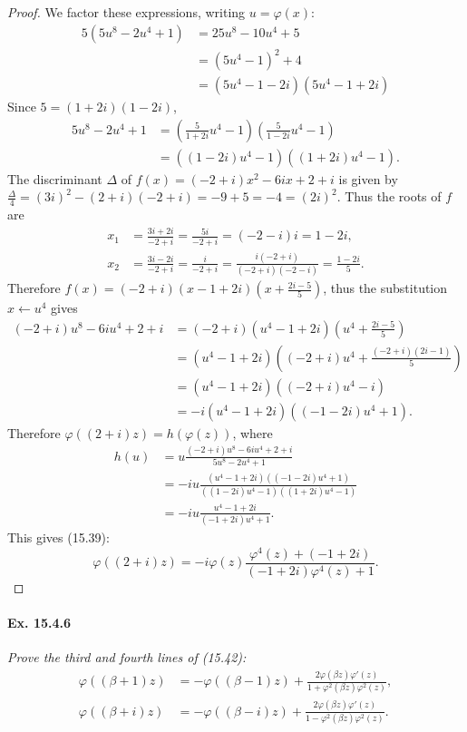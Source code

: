 \documentclass[11pt,a4paper]{article}
\begin{document}
\begin{proof}
We factor these expressions, writing $u = \varphi(x)$:
\begin{align*}
5(5u^8 -2 u^4 + 1) &= 25u^8 - 10 u^4 + 5\\
&=(5u^4 -1)^2 + 4\\
&=(5u^4 - 1-2i)(5u^4 - 1 + 2i)
\end{align*}
Since $5 = (1+2i)(1-2i)$,
\begin{align*}
 5u^8 - 2 u^4 + 1 &= \left(\frac{5}{1+2i} u^4 - 1\right)\left(\frac{5}{1-2i} u^4 - 1 \right)\\
&=((1-2i) u^4 - 1)((1+2i) u^4 - 1).
\end{align*}
The discriminant $\Delta$ of $f(x) = (-2+i)x^2 - 6ix + 2+i$ is given by $\frac{\Delta}{4} = (3i)^2 -(2+i)(-2+i) = -9+ 5 = -4 = (2i)^2$. Thus the roots of $f$ are
\begin{align*}
x_1 &= \frac{3i +2i}{-2+i} = \frac{5i}{-2+i} = (-2-i)i  = 1-2i,\\
x_2 &= \frac{3i -2i}{-2+i} = \frac{i}{-2+i} = \frac{i(-2+i)}{(-2+i)(-2-i)} = \frac{1-2i}{5}.
\end{align*}
Therefore $f(x) = (-2+i)( x-1+2i)\left(x+\frac{2i-5}{5}\right)$, thus the substitution $x \leftarrow u^4$ gives
\begin{align*}
(-2+i)u^8 - 6i u^4 + 2+i &= (-2+i)( u^4-1+2i)\left(u^4+\frac{2i-5}{5}\right)\\
&=( u^4-1+2i)\left((-2+i)u^4 + \frac{(-2+i)(2i-1)}{5}\right)\\
&=( u^4-1+2i)((-2+i)u^4 - i)\\
&= -i(u^4 - 1+2i)((-1-2i)u^4+1).
\end{align*}
Therefore $\varphi((2+i)z) = h(\varphi(z))$, where
\begin{align*}
h(u) &= u \frac{(-2+i)u^8 - 6i u^4 + 2+i}{ 5u^8 - 2 u^4 + 1} \\
&= -iu \frac{(u^4 - 1+2i)((-1-2i)u^4+1)}{((1-2i) u^4 - 1)((1+2i) u^4 - 1)}\\
&= -iu \frac{u^4 - 1 + 2i}{(-1+2i)u^4+1}.
\end{align*}
This gives (15.39):
$$\varphi((2+i)z) = -i\varphi(z) \frac{\varphi^4(z) + (-1+2i)}{(-1+2i) \varphi^4(z) + 1}.$$
\end{proof}

\paragraph{Ex. 15.4.6}{\it Prove the third and fourth lines of (15.42):
\begin{align*}
\varphi((\beta + 1)z) &= -\varphi((\beta-1)z) + \frac{2 \varphi(\beta z)\varphi'(z)}{1 + \varphi^2(\beta z) \varphi^2(z)},\\
\varphi((\beta + i )z) &= -\varphi((\beta-i)z) + \frac{2 \varphi(\beta z)\varphi'(z)}{1 - \varphi^2(\beta z) \varphi^2(z)}.
\end{align*}
}
\end{document}
